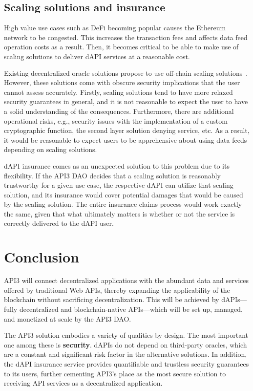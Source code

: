 \documentclass[11pt]{article}
\begin{document}
\subsection{Scaling solutions and insurance}
\label{sec:scaling-solutions-and-insurance}

High value use cases such as DeFi becoming popular causes the Ethereum network to be congested.
This increases the transaction fees and affects data feed operation costs as a result.
Then, it becomes critical to be able to make use of scaling solutions to deliver dAPI services at a reasonable cost.

Existing decentralized oracle solutions propose to use off-chain scaling solutions~\cite{ellis:2017,band}.
However, these solutions come with obscure security implications that the user cannot assess accurately.
Firstly, scaling solutions tend to have more relaxed security guarantees in general, and it is not reasonable to expect the user to have a solid understanding of the consequences.
Furthermore, there are additional operational risks, e.g., security issues with the implementation of a custom cryptographic function, the second layer solution denying service, etc.
As a result, it would be reasonable to expect users to be apprehensive about using data feeds depending on scaling solutions.

dAPI insurance comes as an unexpected solution to this problem due to its flexibility.
If the API3 DAO decides that a scaling solution is reasonably trustworthy for a given use case, the respective dAPI can utilize that scaling solution, and its insurance would cover potential damages that would be caused by the scaling solution.
The entire insurance claims process would work exactly the same, given that what ultimately matters is whether or not the service is correctly delivered to the dAPI user.

\section{Conclusion}
\label{sec:conclusion}

API3 will connect decentralized applications with the abundant data and services offered by traditional Web APIs, thereby expanding the applicability of the blockchain without sacrificing decentralization.
This will be achieved by dAPIs---fully decentralized and blockchain-native APIs---which will be set up, managed, and monetized at scale by the API3 DAO.

The API3 solution embodies a variety of qualities by design.
The most important one among these is \textbf{security}. dAPIs do not depend on third-party oracles, which are a constant and significant risk factor in the alternative solutions.
In addition, the dAPI insurance service provides quantifiable and trustless security guarantees to its users, further cementing API3’s place as the most secure solution to receiving API services as a decentralized application.
\end{document}

